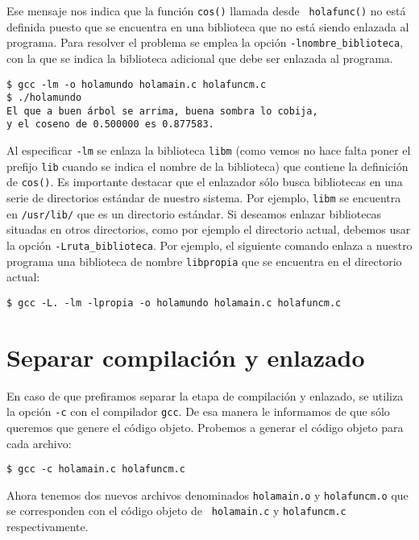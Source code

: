 Ese mensaje nos indica que la función {\tt cos()} llamada desde {\tt
holafunc()} no está definida puesto que se encuentra en una biblioteca
que no está siendo enlazada al programa. Para resolver el problema se
emplea la opción {\tt -lnombre\_biblioteca}, con la que se indica la
biblioteca adicional que debe ser enlazada al programa.

\label{holafuncm}
\begin{verbatim}
$ gcc -lm -o holamundo holamain.c holafuncm.c
$ ./holamundo
El que a buen árbol se arrima, buena sombra lo cobija,
y el coseno de 0.500000 es 0.877583.
\end{verbatim}

Al especificar {\tt -lm} se enlaza la biblioteca {\tt libm} (como
vemos no hace falta poner el prefijo {\tt lib} cuando se indica el
nombre de la biblioteca) que contiene la definición de {\tt cos()}. Es
importante destacar que el enlazador sólo busca bibliotecas en una serie
de directorios estándar de nuestro sistema. Por ejemplo, {\tt libm} se
encuentra en {\tt /usr/lib/} que es un directorio estándar. Si deseamos
enlazar bibliotecas situadas en otros directorios, como por ejemplo el
directorio actual, debemos usar la opción {\tt -Lruta\_biblioteca}. Por
ejemplo, el siguiente comando enlaza a nuestro programa una biblioteca
de nombre {\tt libpropia} que se encuentra en el directorio actual:

\begin{verbatim}
$ gcc -L. -lm -lpropia -o holamundo holamain.c holafuncm.c
\end{verbatim}

\section{Separar compilación y enlazado}

En caso de que prefiramos separar la etapa de compilación y enlazado, se
utiliza la opción {\tt -c} con el compilador {\tt gcc}. De esa manera le
informamos de que sólo queremos que genere el código objeto. Probemos a
generar el código objeto para cada archivo:

\begin{verbatim}
$ gcc -c holamain.c holafuncm.c
\end{verbatim}

Ahora tenemos dos nuevos archivos denominados {\tt holamain.o} y
{\tt holafuncm.o} que se corresponden con el código objeto de {\tt
holamain.c} y {\tt holafuncm.c} respectivamente.

